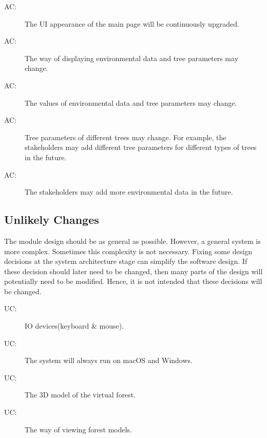 \documentclass[12pt, titlepage]{article}
\newcounter{acnum}
\newcommand{\actheacnum}{AC\theacnum}
\newcounter{ucnum}
\newcommand{\uctheucnum}{UC\theucnum}
\begin{document}
\begin{description}
\item[ \actheacnum \label{acMainUI}:] The UI appearance of the main page
 will be continuously upgraded.
 
\item[ \actheacnum \label{acDataDisplay}:] The way of displaying 
environmental data and tree parameters may change.

\item[ \actheacnum \label{acDataValue}:] The values of
environmental data and tree parameters may change.

\item[ \actheacnum \label{acTreeParam}:] Tree parameters of different
trees may change. For example, the stakeholders may add different tree parameters for 
different types of trees in the future.

\item[ \actheacnum \label{acEnvData}:] The stakeholders may add more
environmental data in the future.

\end{description}

\subsection{Unlikely Changes} \label{SecUchange}

The module design should be as general as possible. However, a general system is
more complex. Sometimes this complexity is not necessary. Fixing some design
decisions at the system architecture stage can simplify the software design. If
these decision should later need to be changed, then many parts of the design
will potentially need to be modified. Hence, it is not intended that these
decisions will be changed.

\begin{description}
\item[ \uctheucnum \label{ucIO}:]  IO devices(keyboard \& mouse). 
\item[ \uctheucnum \label{ucOS}:] The system will always run on 
macOS and Windows. 
\item[ \uctheucnum \label{ucModel}:] The 3D model of the virtual forest.
\item[ \uctheucnum \label{ucMove}:] The way of viewing forest models.
\end{description}
\end{document}
